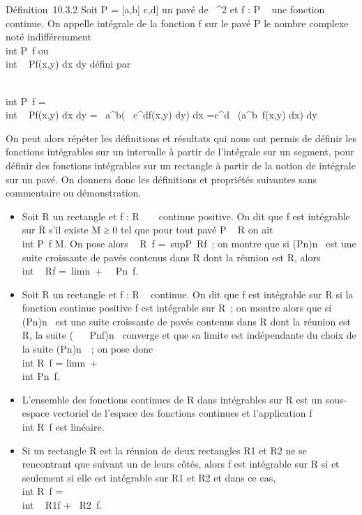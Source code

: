 Définition~10.3.2 Soit P = {[}a,b{]} \times {[}c,d{]} un pavé de
~^2 et f : P \rightarrow~  une fonction continue. On appelle intégrale
de la fonction f sur le pavé P le nombre complexe noté indifféremment
\int  \\int  P~f
ou \int  \\int ~
Pf(x,y) dx dy défini par

\int  \\int  P~f
=\int  \\int ~
Pf(x,y) dx dy =\int ~
a^b\left (\int ~
c^df(x,y) dy\right ) dx
=\int  c^d~\left
(\int  a^b~f(x,y)
dx\right ) dy

On peut alors répéter les définitions et résultats qui nous ont permis
de définir les fonctions intégrables sur un intervalle à partir de
l'intégrale sur un segment, pour définir des fonctions intégrables sur
un rectangle à partir de la notion de intégrale sur un pavé. On donnera
donc les définitions et propriétés suivantes sans commentaire ou
démonstration.

\begin{itemize}
\itemsep1pt\parskip0pt
\item
  Soit R un rectangle et f : R \rightarrow~ ~ continue positive. On dit que f est
  intégrable sur R s'il existe M ≥ 0 tel que pour tout pavé P \subset~ R on ait
  \int  \\int  P~f
  \leq M. On pose alors \int ~
  \int  R~f =\
  supP\subset~Rf~; on montre que si (Pn)n\in{}~ est
  une suite croissante de pavés contenus dans R dont la réunion est R,
  alors \int  \\int ~
  Rf =\
  limn\rightarrow~+\infty~\int ~
  \int  Pn~f.
\item
  Soit R un rectangle et f : R \rightarrow~  continue. On dit que f est intégrable
  sur R si la fonction continue positive \textbar{}f\textbar{} est
  intégrable sur R~; on montre alors que si (Pn)n\in\mathbb{N}~
  est une suite croissante de pavés contenus dans R dont la réunion est
  R, la suite \left (\int ~
  \int ~
  Pnf\right )n\in{}~ converge et
  que sa limite est indépendante du choix de la suite
  (Pn)n\in\mathbb{N}~~; on pose donc \\int
   \int  R~f
  = limn\rightarrow~+\infty~~\\int
   \int  Pn~f.
\item
  L'ensemble des fonctions continues de R dans  intégrables sur R est
  un sous-espace vectoriel de l'espace des fonctions continues et
  l'application f\mapsto~\\int
   \int  R~f est linéaire.
\item
  Si un rectangle R est la réunion de deux rectangles R1 et
  R2 ne se rencontrant que suivant un de leurs côtés, alors f
  est intégrable sur R si et seulement si elle est intégrable sur
  R1 et R2 et dans ce cas, \\int
   \int  R~f
  =\int  \\int ~
  R1f +\int ~
  \int  R2~f.
\end{itemize}

